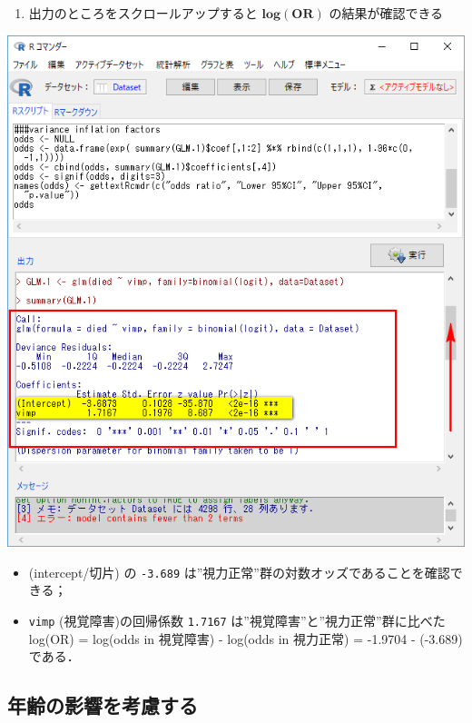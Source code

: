 \documentclass[11pt,]{problemset}
\providecommand{\tightlist}{%
  \setlength{\itemsep}{0pt}\setlength{\parskip}{0pt}}
\begin{document}
\begin{enumerate}
\def\labelenumi{\arabic{enumi}.}
\setcounter{enumi}{9}
\tightlist
\item
  出力のところをスクロールアップすると \(\mathbf{log(OR)}\)
  の結果が確認できる
\end{enumerate}

\begin{center}\includegraphics[width=0.52\linewidth]{pic/logstic09} \end{center}

\begin{itemize}
\tightlist
\item
  (intercept/切片) の \texttt{-3.689}
  は''視力正常''群の対数オッズであることを確認できる；
\item
  \texttt{vimp} (視覚障害)の回帰係数 \texttt{1.7167}
  は''視覚障害''と''視力正常''群に比べた log(OR) = log(odds in 視覚障害)
  - log(odds in 視力正常) = -1.9704 - (-3.689)である．
\end{itemize}

\subsection{年齢の影響を考慮する}
\end{document}
